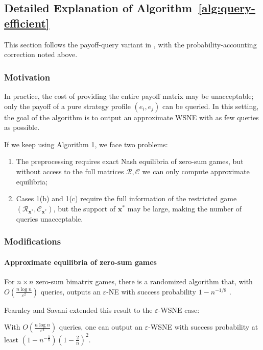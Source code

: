 \subsection{Detailed Explanation of Algorithm~\ref{alg:query-efficient}}
\label{app:algo-2-details}

This section follows the payoff-query variant in \cite[Section~4]{12WSNE}, with the probability-accounting correction noted above.

\subsubsection{Motivation}
In practice, the cost of providing the entire payoff matrix may be unacceptable; only the payoff of a pure strategy profile \((e_i, e_j)\) can be queried. In this setting, the goal of the algorithm is to output an approximate WSNE with as few queries as possible.

If we keep using Algorithm 1, we face two problems:
\begin{enumerate}
  \item The preprocessing requires exact Nash equilibria of zero-sum games, but without access to the full matrices \(\mathcal{R}, \mathcal{C}\) we can only compute approximate equilibria;
  \item Cases 1(b) and 1(c) require the full information of the restricted game \((\mathcal{R}_{\mathbf{x}^*}, \mathcal{C}_{\mathbf{x}^*})\), but the support of \(\mathbf{x}^*\) may be large, making the number of queries unacceptable.
\end{enumerate}

\subsubsection{Modifications}

\paragraph{Approximate equilibria of zero-sum games}

For \(n \times n\) zero-sum bimatrix games, there is a randomized algorithm that, with \(O\left(\frac{n \log n}{\varepsilon^2}\right)\) queries, outputs an \(\varepsilon\)-NE with success probability \(1 - n^{-1/8}\) \cite[Theorem~1]{goldbergRoth14}.

Fearnley and Savani extended this result to the \(\varepsilon\)-WSNE case:
\begin{lemma}
  \label{lem:query-efficient-eps-wsne-in-zero-sum-games}
  With \(O\left(\frac{n \log n}{\varepsilon^4}\right)\) queries, one can output an \(\varepsilon\)-WSNE with success probability at least \(\left( 1 - n^{-\frac{1}{8}} \right)\left( 1 - \frac{2}{n} \right)^2\).
\end{lemma}

